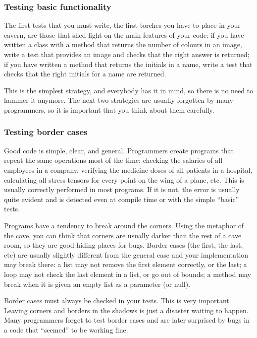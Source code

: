 \subsubsection{Testing basic functionality}
\label{sec:test-basic-funct}

The first tests that you must write, the first torches you have to
place in your cavern, are those that shed light on the main features
of your code: if you have written a class with a method that returns
the number of colours in an image, write a test that provides an image
and checks that the right answer is returned; if you have written a
method that returns the initials in a name, write a test that checks
that the right initials for a name are returned. 

This is the simplest strategy, and everybody has it in mind, so there
is no need to hammer it anymore. The next two strategies are usually
forgotten by many programmers, so it is important that you think about
them carefully. 

\subsubsection{Testing border cases}
\label{sec:testing-border-cases}

Good code is simple, clear, and general. Programmers create programs
that repeat the same operations most of the time: checking the
salaries of all employees in a company, verifying the medicine doses
of all patients in a hospital, calculating all stress tensors for
every point on the wing of a plane, etc. This is usually correctly
performed in most programs. If it is not, the error is usually quite
evident and is detected even at compile time or with the simple
``basic'' tests. 

Programs have a tendency to break around the corners. Using the
metaphor of the cave, you can think that corners are usually darker
than the rest of a cave room, so they are good hiding places for
bugs. Border cases (the first, the last, etc) are usually slightly
different from the general case and your implementation may break
there: a list may not remove the first element correctly, or the
last; a loop may not check the last element in a list, or go out of
bounds; a method may break when it is given an empty list as a
parameter (or null). 

Border cases must always be checked in your tests. This is very
important. Leaving corners and borders in the shadows is just a
disaster waiting to happen. Many programmers forget to test border
cases and are later surprised by bugs in a code that ``seemed'' to be
working fine.

